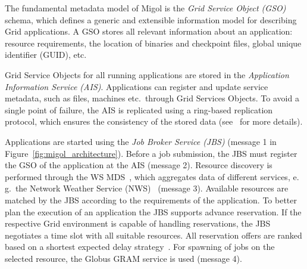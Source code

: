 \documentclass[times, 10pt, twocolumn]{article}
\begin{document}
The fundamental metadata model of Migol is the \emph{Grid Service Object (GSO)} schema,
which defines a generic and extensible information model for
describing Grid applications.  
A GSO stores all relevant information about an application: resource requirements,
the location of binaries and checkpoint files, global unique identifier (GUID),
etc.

Grid Service Objects for all running applications are stored in 
the {\em Application Information Service (AIS)}. 
Applications can register and update service metadata, 
such as files, machines etc.\ through Grid Services Objects. 
To avoid a single point of failure, the AIS is replicated using a ring-based
replication protocol, which ensures  the consistency of the stored data
(see~\cite{Luckow:2008ys} for more details).

Applications are started using the {\em Job Broker Service (JBS)} (message 1 in 
Figure~\ref{fig:migol_architecture}). Before a job
submission, the JBS must register the GSO of the application at the AIS (message 2).
Resource discovery is performed through the WS MDS~\cite{schopf06},
which aggregates data of different services, e.\,g.\ the Network
Weather Service (NWS)~\cite{NWS99} (message 3).  Available resources are matched
by the JBS according to the requirements of the application. To better plan the execution of 
an application the JBS supports advance reservation. If the respective Grid environment is capable of handling reservations, the JBS negotiates 
a time slot with all suitable resources. All reservation offers are ranked based on a shortest expected
delay strategy~\cite{Jeske:2007wj}.  For spawning of jobs on the selected resource, the Globus GRAM service is used (message 4).
             
\end{document}
